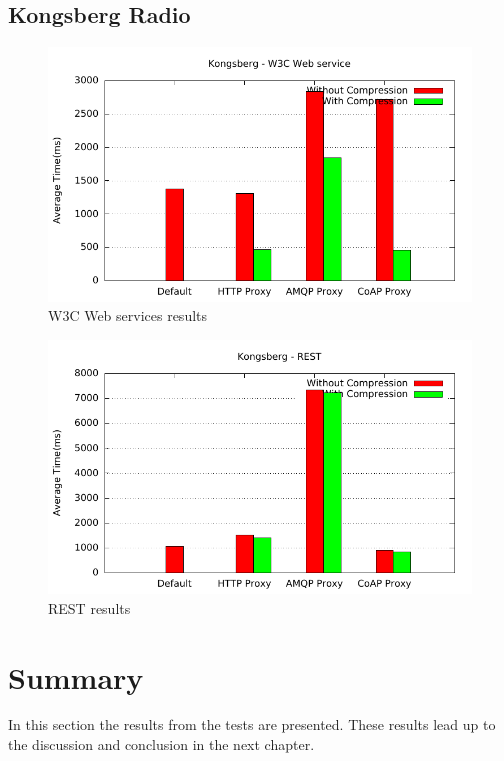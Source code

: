 \subsection{Kongsberg Radio}
\begin{figure}[H]
\center
\includegraphics[scale=0.75]{../results/kongsberg/nffi/out.pdf}
\caption{W3C Web services results}
\end{figure}

\begin{figure}[H]
\center
\includegraphics[scale=0.75]{../results/kongsberg/rest/out.pdf}
\caption{REST results}
\end{figure}


\section{Summary}

In this section the results from the tests are presented. These results lead up
to the discussion and conclusion in the next chapter.
